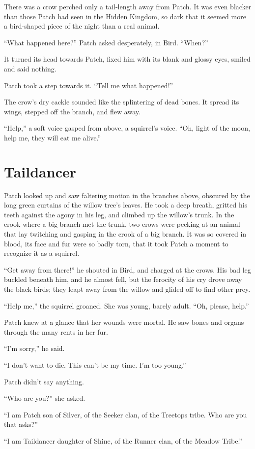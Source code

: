 \documentclass[ebook,oneside,openany,17pt]{memoir}
\renewcommand{\thechapter}{\Roman{chapter}}
\newcounter{sections}
\newcommand{\sections}[1]{%
  \section*{#1}
  \addtocounter{sections}{1}%
  \pdfbookmark[1]{#1}{section.\thechapter.\thesections}}
\begin{document}
There was a crow perched only a tail-length away from Patch. It was
even blacker than those Patch had seen in the Hidden Kingdom, so dark
that it seemed more a bird-shaped piece of the night than a real
animal.

“What happened here?” Patch asked desperately, in Bird. “When?”

It turned its head towards Patch, fixed him with its blank and glossy
eyes, smiled and said nothing.

Patch took a step towards it. “Tell me what happened!”

The crow’s dry cackle sounded like the splintering of dead bones. It
spread its wings, stepped off the branch, and flew away.

“Help,” a soft voice gasped from above, a squirrel’s voice. “Oh, light
of the moon, help me, they will eat me alive.”


\sections{Taildancer}

Patch looked up and saw faltering motion in the branches above,
obscured by the long green curtains of the willow tree’s leaves. He
took a deep breath, gritted his teeth against the agony in his leg,
and climbed up the willow’s trunk. In the crook where a big branch met
the trunk, two crows were pecking at an animal that lay twitching and
gasping in the crook of a big branch. It was so covered in blood, its
face and fur were so badly torn, that it took Patch a moment to
recognize it as a squirrel.

“Get away from there!” he shouted in Bird, and charged at the
crows. His bad leg buckled beneath him, and he almost fell, but the
ferocity of his cry drove away the black birds; they leapt away from
the willow and glided off to find other prey.

“Help me,” the squirrel groaned. She was young, barely adult. “Oh,
please, help.”

Patch knew at a glance that her wounds were mortal. He saw bones and
organs through the many rents in her fur.

“I’m sorry,” he said.

“I don’t want to die. This can’t be my time. I’m too young.”

Patch didn’t say anything.

“Who are you?” she asked.

“I am Patch son of Silver, of the Seeker clan, of the Treetops
tribe. Who are you that asks?”

“I am Taildancer daughter of Shine, of the Runner clan, of the Meadow
Tribe.”
\end{document}
